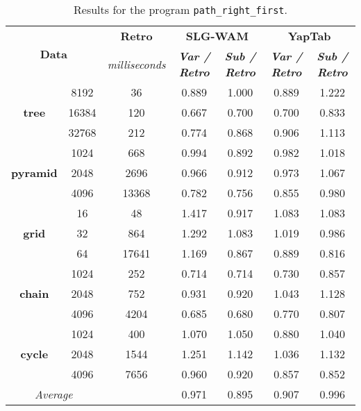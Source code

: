 \begin{table}[ht]
\centering
\footnotesize{
  \begin{tabular}{cc|c|cc|cc}
   \hline
    \hline
    \multicolumn{2}{c|}{\multirow{2}{*}{\small{\textbf{Data}}}} & \textbf{\small{Retro}} & \multicolumn{2}{c|}{\small{\textbf{SLG-WAM}}} & \multicolumn{2}{c}{\small{\textbf{YapTab}}} \\
     \multicolumn{2}{c|}{} & \scriptsize{\textit{milliseconds}} & \textbf{\textit{\scriptsize{Var / Retro}}} & \textbf{\textit{\scriptsize{Sub / Retro}}} & \textbf{\textit{\scriptsize{Var / Retro}}} & \textbf{\textit{\scriptsize{Sub / Retro}}} \\
   \hline
   \hline

\multirow{3}{*}{\textbf{tree}} &  8192 &  36 &  0.889  &  1.000  &  0.889 & 1.222 \\
&  16384 &  120 &  0.667  &  0.700  &  0.700 & 0.833 \\
&  32768 &  212 &  0.774  &  0.868  &  0.906 & 1.113 \\
\hline
\multirow{3}{*}{\textbf{pyramid}} &  1024 &  668 &  0.994  &  0.892  &  0.982 & 1.018 \\
&  2048 &  2696 &  0.966  &  0.912  &  0.973 & 1.067 \\
&  4096 &  13368 &  0.782  &  0.756  &  0.855 & 0.980 \\
\hline
\multirow{3}{*}{\textbf{grid}} &  16 &  48 &  1.417  &  0.917  &  1.083 & 1.083 \\
&  32 &  864 &  1.292  &  1.083  &  1.019 & 0.986 \\
&  64 &  17641 &  1.169  &  0.867  &  0.889 & 0.816 \\
\hline
\multirow{3}{*}{\textbf{chain}} &  1024 &  252 &  0.714  &  0.714  &  0.730 & 0.857 \\
&  2048 &  752 &  0.931  &  0.920  &  1.043 & 1.128 \\
&  4096 &  4204 &  0.685  &  0.680  &  0.770 & 0.807 \\
\hline
\multirow{3}{*}{\textbf{cycle}} &  1024 &  400 &  1.070  &  1.050  &  0.880 & 1.040 \\
&  2048 &  1544 &  1.251  &  1.142  &  1.036 & 1.132 \\
&  4096 &  7656 &  0.960  &  0.920  &  0.857 & 0.852 \\
\hline
\hline
\multicolumn{2}{c}{\textit{Average}} & & 0.971 & 0.895 & 0.907 & 0.996 \\ 
\hline
\hline
\end{tabular}
}
\caption{Results for the program \texttt{path\_right\_first}.}
\label{tbl:prefix_path_right_first}
\end{table}

